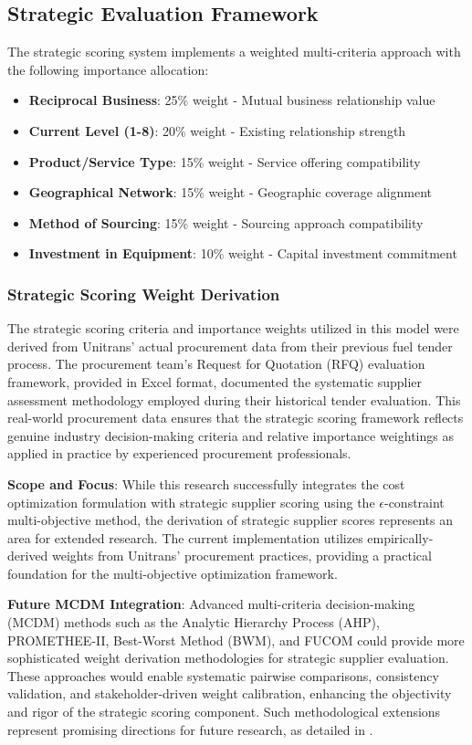 \subsection{Strategic Evaluation Framework}
The strategic scoring system implements a weighted multi-criteria approach with the following importance allocation:
\begin{itemize}
    \item \textbf{Reciprocal Business}: 25\% weight - Mutual business relationship value
    \item \textbf{Current Level (1-8)}: 20\% weight - Existing relationship strength
    \item \textbf{Product/Service Type}: 15\% weight - Service offering compatibility
    \item \textbf{Geographical Network}: 15\% weight - Geographic coverage alignment
    \item \textbf{Method of Sourcing}: 15\% weight - Sourcing approach compatibility
    \item \textbf{Investment in Equipment}: 10\% weight - Capital investment commitment
\end{itemize}

\subsubsection{Strategic Scoring Weight Derivation}
The strategic scoring criteria and importance weights utilized in this model were derived from Unitrans' actual procurement data from their previous fuel tender process. The procurement team's Request for Quotation (RFQ) evaluation framework, provided in Excel format, documented the systematic supplier assessment methodology employed during their historical tender evaluation. This real-world procurement data ensures that the strategic scoring framework reflects genuine industry decision-making criteria and relative importance weightings as applied in practice by experienced procurement professionals.

\textbf{Scope and Focus}: While this research successfully integrates the cost optimization formulation with strategic supplier scoring using the $\epsilon$-constraint multi-objective method, the derivation of strategic supplier scores represents an area for extended research. The current implementation utilizes empirically-derived weights from Unitrans' procurement practices, providing a practical foundation for the multi-objective optimization framework.

\textbf{Future MCDM Integration}: Advanced multi-criteria decision-making (MCDM) methods such as the Analytic Hierarchy Process (AHP), PROMETHEE-II, Best-Worst Method (BWM), and FUCOM could provide more sophisticated weight derivation methodologies for strategic supplier evaluation. These approaches would enable systematic pairwise comparisons, consistency validation, and stakeholder-driven weight calibration, enhancing the objectivity and rigor of the strategic scoring component. Such methodological extensions represent promising directions for future research, as detailed in .

